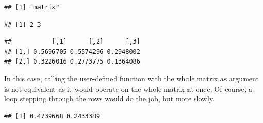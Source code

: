 \documentclass[krantz2]{krantz}\usepackage{knitr}%
\begin{document}
\begin{explainbox}
\begin{knitrout}\footnotesize
{}\color{fgcolor}\begin{kframe}
\begin{alltt}
\hlstd{(}\hlstd{)}
 \hlkwb{<-} \hlstd{(}\hlstd{(}\hlstd{),}  \hlstd{=} \hlstd{)}
 \hlkwb{<-} \hlstd{(}\hlstd{,}  \hlstd{=} \hlstd{) \{}
       \hlstd{(}      
    \hlstd{\}}
 \hlkwb{<-} \hlstd{(}   \hlstd{=} \hlstd{,}    \hlstd{=} \hlstd{)}
\end{alltt}
\begin{verbatim}
## [1] "matrix"
\end{verbatim}
\begin{alltt}
\end{alltt}
\begin{verbatim}
## [1] 2 3
\end{verbatim}
\begin{alltt}
\end{alltt}
\begin{verbatim}
##           [,1]      [,2]      [,3]
## [1,] 0.5696705 0.5574296 0.2948002
## [2,] 0.3226016 0.2773775 0.1364086
\end{verbatim}
\end{kframe}
\end{knitrout}

In this case, calling the user-defined function with the whole matrix as argument is not equivalent as it would operate on the whole matrix at once. Of course, a  loop stepping through the rows would do the job, but more slowly.

\begin{knitrout}\footnotesize
{}\color{fgcolor}\begin{kframe}
\begin{alltt}
\end{alltt}
\begin{verbatim}
## [1] 0.4739668 0.2433389
\end{verbatim}
\end{kframe}
\end{knitrout}
\end{explainbox}
\end{document}
